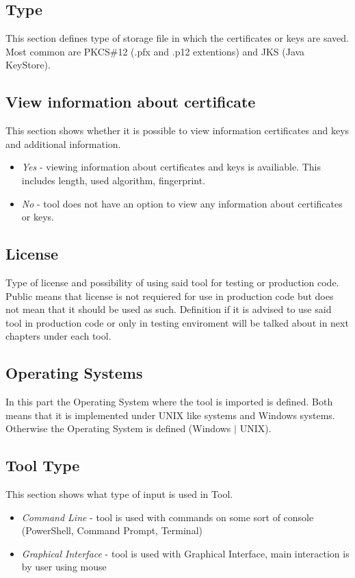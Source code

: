 \documentclass[10pt, a4paper]{report}
\begin{document}
\subsection{Type}
This section defines type of storage file in which the certificates or keys are saved. Most common are PKCS\#12 (.pfx and .p12 extentions) and JKS (Java KeyStore). 

\subsection{View information about certificate}
This section shows whether it is possible to view information certificates and keys and additional information. 
    \begin{itemize}
     \item \textit{Yes} - viewing information about certificates and keys is availiable. This includes length, used algorithm, fingerprint.
     \item \textit{No}  - tool does not have an option to view any information about certificates or keys.
    \end{itemize}
\subsection{License}
Type of license and possibility of using said tool for testing or production code. Public means that license is not requiered for use in production code but does not mean that it should be used as such. Definition if it is advised to use said tool in production code or only in testing enviroment will be talked about in next chapters under each tool.

\subsection{Operating Systems}
In this part the Operating System where the tool is imported is defined. Both means that it is implemented under UNIX like systems and Windows systems. Otherwise the Operating System is defined (Windows $\vert$ UNIX).

\subsection{Tool Type}
This section shows what type of input is used in Tool. 
\begin{itemize}
\item \textit{Command Line} - tool is used with commands on some sort of console (PowerShell, Command Prompt, Terminal)
\item \textit{Graphical Interface} - tool is used with Graphical Interface, main interaction is by user using mouse
\end{itemize}
\newpage
\end{document}
